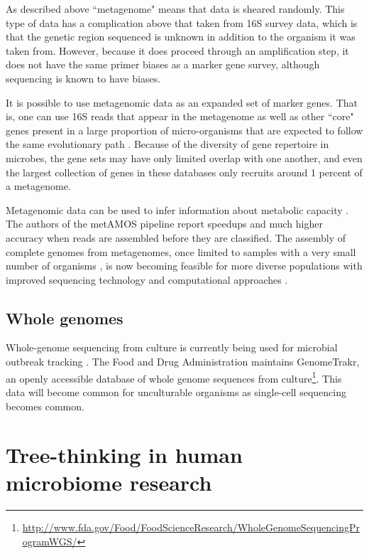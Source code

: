 \documentclass{amsart}
\begin{document}
As described above ``metagenome" means that data is sheared randomly.
This type of data has a complication above that taken from 16S survey data, which is that the genetic region sequenced is unknown in addition to the organism it was taken from.
However, because it does proceed through an amplification step, it does not have the same primer biases as a marker gene survey, although sequencing is known to have biases.

It is possible to use metagenomic data as an expanded set of marker genes.
That is, one can use 16S reads that appear in the metagenome as well as other ``core" genes present in a large proportion of micro-organisms that are expected to follow the same evolutionary path \citep{von2007quantitative,wu2008amphora,stark2010mltreemap,kembel2011phylogenetic}.
Because of the diversity of gene repertoire in microbes, the gene sets may have only limited overlap with one another, and even the largest collection of genes in these databases only recruits around 1 percent of a metagenome.

Metagenomic data can be used to infer information about metabolic capacity \cite{greenblum2012metagenomic,abubucker2012metabolic}.
The authors of the metAMOS pipeline \citep{treangen2013metamos} report speedups and much higher accuracy when reads are assembled before they are classified.
The assembly of complete genomes from metagenomes, once limited to samples with a very small number of organisms \citep{baker2010enigmatic}, is now becoming feasible for more diverse populations with improved sequencing technology and computational approaches \cite{howe2012assembling,pell2012scaling,iverson2012untangling,emerson2012metagenomic,podell2013assembly}.


\subsection{Whole genomes}
Whole-genome sequencing from culture is currently being used for microbial outbreak tracking \citep{koser2012rapid,snitkin2012tracking}.
The Food and Drug Administration maintains GenomeTrakr, an openly accessible database of whole genome sequences from culture\footnote{\url{http://www.fda.gov/Food/FoodScienceResearch/WholeGenomeSequencingProgramWGS/}}.
This data will become common for unculturable organisms as single-cell sequencing \citep[reviewed in][]{kalisky2011single} becomes common.




\section{Tree-thinking in human microbiome research}
\end{document}
